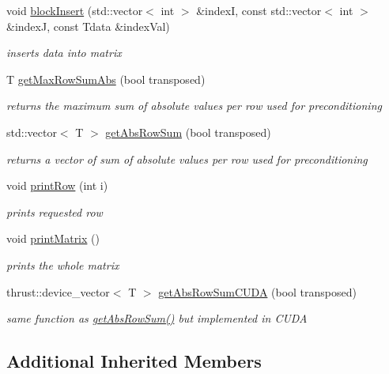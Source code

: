 \begin{DoxyCompactItemize}
void \hyperlink{classflex_matrix_a028e2ab5d2ebbf2eec2e1a0c13e60421}{block\+Insert} (std\+::vector$<$ int $>$ \&indexI, const std\+::vector$<$ int $>$ \&indexJ, const Tdata \&index\+Val)
\begin{DoxyCompactList}\small\item\em inserts data into matrix \end{DoxyCompactList}\item 
T \hyperlink{classflex_matrix_a25cd9571e7056c4ad035a44a57e1d45d}{get\+Max\+Row\+Sum\+Abs} (bool transposed)
\begin{DoxyCompactList}\small\item\em returns the maximum sum of absolute values per row used for preconditioning \end{DoxyCompactList}\item 
std\+::vector$<$ T $>$ \hyperlink{classflex_matrix_a75f378787fc81ea2c570c9848a7f2588}{get\+Abs\+Row\+Sum} (bool transposed)
\begin{DoxyCompactList}\small\item\em returns a vector of sum of absolute values per row used for preconditioning \end{DoxyCompactList}\item 
void \hyperlink{classflex_matrix_aafd59b0c2f60fbff0df13fd3888f1cf3}{print\+Row} (int i)
\begin{DoxyCompactList}\small\item\em prints requested row \end{DoxyCompactList}\item 
\mbox{\label{classflex_matrix_a25b466ea4ccd744b53cc13741b61cfc2}} 
void \hyperlink{classflex_matrix_a25b466ea4ccd744b53cc13741b61cfc2}{print\+Matrix} ()
\begin{DoxyCompactList}\small\item\em prints the whole matrix \end{DoxyCompactList}\item 
thrust\+::device\+\_\+vector$<$ T $>$ \hyperlink{classflex_matrix_ae713d5dabcdab30df9b04f2a7d499235}{get\+Abs\+Row\+Sum\+C\+U\+DA} (bool transposed)
\begin{DoxyCompactList}\small\item\em same function as \hyperlink{classflex_matrix_a75f378787fc81ea2c570c9848a7f2588}{get\+Abs\+Row\+Sum()} but implemented in C\+U\+DA \end{DoxyCompactList}\end{DoxyCompactItemize}
\subsection*{Additional Inherited Members}


